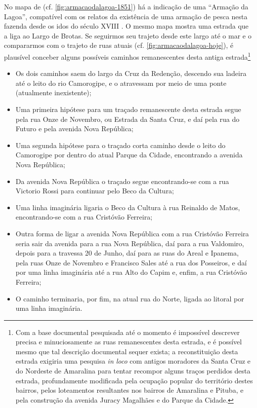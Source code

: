 \begin{citacao}
No mapa de  (cf. \autoref{fig:armacaodalagoa-1851}) há a indicação de uma ``Armação da Lagoa'', compatível com os relatos da existência de uma armação de pesca nesta fazenda desde os idos do século XVIII \cite[p.~120-121]{campos_alagoa_1942}. O mesmo mapa mostra uma estrada que a liga ao Largo de Brotas. Se seguirmos seu trajeto desde este largo até o mar e o compararmos com o trajeto de ruas atuais (cf. \autoref{fig:armacaodalagoa-hoje}), é plausível conceber alguns possíveis caminhos remanescentes desta antiga estrada\footnote{Com a base documental pesquisada até o momento é impossível descrever precisa e minuciosamente as ruas remanescentes desta estrada, e é possível mesmo que tal descrição documental sequer exista; a reconstituição desta estrada exigiria uma pesquisa \textit{in loco} com antigos moradores da Santa Cruz e do Nordeste de Amaralina para tentar recompor alguns traços perdidos desta estrada, profundamente modificada pela ocupação popular do território destes bairros, pelos loteamentos resultantes nos bairros de Amaralina e Pituba, e pela construção da avenida Juracy Magalhães e do Parque da Cidade.}

\begin{itemize}
\item Os dois caminhos saem do largo da Cruz da Redenção, descendo sua ladeira até o leito do rio Camorogipe, e o atravessam por meio de uma ponte (atualmente inexistente);
\item Uma primeira hipótese para um traçado remanescente desta estrada segue pela rua Onze de Novembro, ou Estrada da Santa Cruz, e daí pela rua do Futuro e pela avenida Nova República;
\item Uma segunda hipótese para o traçado corta caminho desde o leito do Camorogipe por dentro do atual Parque da Cidade, encontrando a avenida Nova República;
\item Da avenida Nova República o traçado segue encontrando-se com a rua Victorio Rossi para continuar pelo Beco da Cultura;
\item Uma linha imaginária ligaria o Beco da Cultura à rua Reinaldo de Matos, encontrando-se com a rua Cristóvão Ferreira;
\item Outra forma de ligar a avenida Nova República com a rua Cristóvão Ferreira seria sair da avenida para a rua Nova República, daí para a rua Valdomiro, depois para a travessa 20 de Junho, daí para as ruas do Areal e Ipanema, pela ruas Onze de Novembro e Francisco Sales até a rua dos Posseiros, e daí por uma linha imaginária até a rua Alto do Capim e, enfim, a rua Cristóvão Ferreira;
\item O caminho terminaria, por fim, na atual rua do Norte, ligada ao litoral por uma linha imaginária. 
\end{itemize}


\end{citacao}
